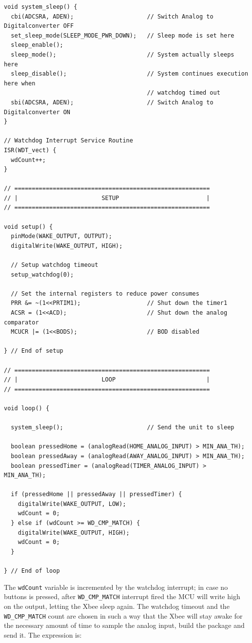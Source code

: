 \documentclass[11pt,english]{article}
\newcommand{\code}[1]{\texttt{#1}}
\begin{document}
%
\begin{lstlisting}[label=lis-attiny,caption=ATtiny main code]
void system_sleep() {
  cbi(ADCSRA, ADEN);                     // Switch Analog to Digitalconverter OFF
  set_sleep_mode(SLEEP_MODE_PWR_DOWN);   // Sleep mode is set here
  sleep_enable();
  sleep_mode();                          // System actually sleeps here
  sleep_disable();                       // System continues execution here when
                                         // watchdog timed out
  sbi(ADCSRA, ADEN);                     // Switch Analog to Digitalconverter ON
}

// Watchdog Interrupt Service Routine
ISR(WDT_vect) {
  wdCount++;
}

// ========================================================
// |                        SETUP                         |
// ========================================================

void setup() {
  pinMode(WAKE_OUTPUT, OUTPUT);
  digitalWrite(WAKE_OUTPUT, HIGH);

  // Setup watchdog timeout
  setup_watchdog(0);

  // Set the internal registers to reduce power consumes
  PRR &= ~(1<<PRTIM1);                   // Shut down the timer1
  ACSR = (1<<ACD);                       // Shut down the analog comparator
  MCUCR |= (1<<BODS);                    // BOD disabled

} // End of setup

// ========================================================
// |                        LOOP                          |
// ========================================================

void loop() {

  system_sleep();                        // Send the unit to sleep

  boolean pressedHome = (analogRead(HOME_ANALOG_INPUT) > MIN_ANA_TH);
  boolean pressedAway = (analogRead(AWAY_ANALOG_INPUT) > MIN_ANA_TH);
  boolean pressedTimer = (analogRead(TIMER_ANALOG_INPUT) > MIN_ANA_TH);

  if (pressedHome || pressedAway || pressedTimer) {
    digitalWrite(WAKE_OUTPUT, LOW);
    wdCount = 0;
  } else if (wdCount >= WD_CMP_MATCH) {
    digitalWrite(WAKE_OUTPUT, HIGH);
    wdCount = 0;
  }

} // End of loop

\end{lstlisting}

The \code{wdCount} variable is incremented by the watchdog interrupt; in case no buttons is pressed, after 
\code{WD\_CMP\_MATCH} interrupt fired the MCU will write high on the output, letting the Xbee sleep again.
The watchdog timeout and the \code{WD\_CMP\_MATCH} count are chosen in such a way that the Xbee will stay 
awake for the necessary amount of time to sample the analog input, build the package and send it. 
The expression is:
\end{document}
